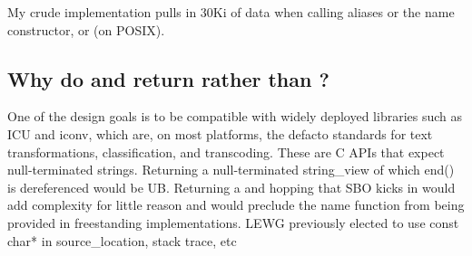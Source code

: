 \documentclass{wg21}
\begin{document}
My crude implementation pulls in 30Ki of data when calling aliases or the name constructor, or  (on POSIX).

\subsection{Why do  and  return  rather than ?}

One of the design goals is to be compatible with widely deployed libraries such as ICU and iconv, which are, on most platforms, the defacto standards for text transformations, classification, and transcoding.
These are C APIs that expect null-terminated strings.
Returning a null-terminated string_view of which end() is dereferenced would be UB.
Returning a  and hopping that SBO kicks in would add complexity for little reason and would preclude the name function from being provided in freestanding implementations.
LEWG previously elected to use const char* in source_location, stack trace, etc
\end{document}
